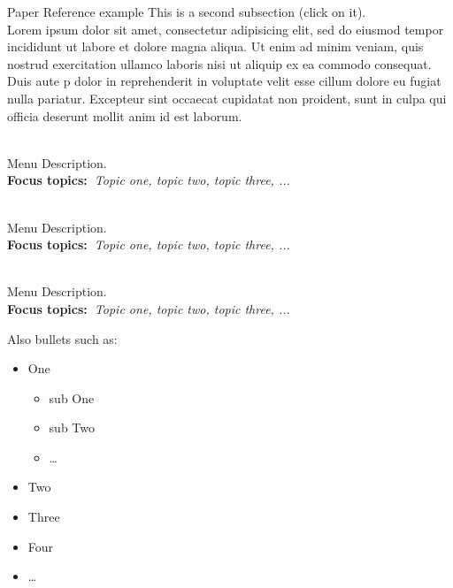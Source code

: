   Paper Reference example This is a second subsection (click on it)\cite{bazerman1988shaping}. ~\\
  
  Lorem ipsum dolor sit amet, consectetur adipisicing elit, sed do eiusmod
  tempor incididunt ut labore et dolore magna aliqua. Ut enim ad minim veniam,
  quis nostrud exercitation ullamco laboris nisi ut aliquip ex ea commodo
  consequat. Duis aute p dolor in reprehenderit in voluptate velit esse
  cillum dolore eu fugiat nulla pariatur. Excepteur sint occaecat cupidatat non
  proident, sunt in culpa qui officia deserunt mollit anim id est laborum.

  \begin{description}\addtolength{\itemsep}{-0.35\baselineskip}%
  
    \item[\textbullet~\bfseries Menu Item] \hfill \\%
      Menu Description.~\\%
      {\textbf{Focus topics:~}\emph{Topic one, topic two, topic three, ...}}%
    
    \item[\textbullet~\bfseries Menu Item] \hfill \\%
      Menu Description.~\\%
      {\textbf{Focus topics:~}\emph{Topic one, topic two, topic three, ...}}%
    
    
    \item[\textbullet~\bfseries Menu Item] \hfill \\%
      Menu Description.~\\%
      {\textbf{Focus topics:~}\emph{Topic one, topic two, topic three, ...}}%
  
  \end{description}
  Also bullets such as:%
  \begin{itemize}\addtolength{\itemsep}{-0.35\baselineskip}%
    \item One%
        \begin{itemize}\addtolength{\itemsep}{-0.35\baselineskip}%
        \item sub One%
        \item sub Two%
        \item \ldots%
        \end{itemize}%
    \item Two%
    \item Three%
    \item Four%
    \item \ldots%
  \end{itemize}%
  
